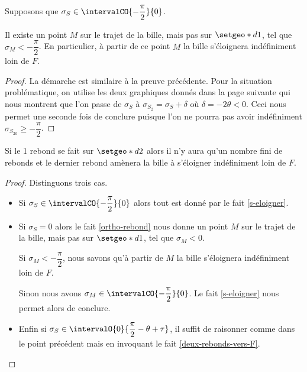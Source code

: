 \medskip


\begin{fact} \label{s-eloigner}
	Supposons que $\sigma_S \in \intervalCO{- \dfrac{\pi}{2}}{0}$.

	\medskip
	
	Il existe un point $M$ sur le trajet de la bille, mais pas sur $\setgeo*{d}{1}$, tel que $\sigma_M < - \dfrac{\pi}{2}$. En particulier, à partir de ce point $M$ la bille s'éloignera indéfiniment loin de $F$.
\end{fact}

\begin{proof}
	La démarche est similaire à la preuve précédente.
	Pour la situation problématique, on utilise les deux graphiques donnés dans la page suivante qui nous montrent que l'on passe de $\sigma_S$ à $\sigma_{S_2} = \sigma_S + \delta$ où $\delta = - 2 \theta < 0$. Ceci nous permet une seconde fois de conclure puisque l'on ne pourra pas avoir indéfiniment $\sigma_{S_{2k}} \geqslant - \dfrac{\pi}{2}$.
\end{proof}


\medskip


\begin{theorem}
	Si le 1\ier{} rebond se fait sur $\setgeo*{d}{2}$ alors il n'y aura qu'un nombre fini de rebonds et le dernier rebond amènera la bille à s'éloigner indéfiniment loin de $F$.
\end{theorem}

\begin{proof}
	Distinguons trois cas.
	
	\begin{itemize}[label = \textbullet]
		\item Si $\sigma_S \in \intervalCO{- \dfrac{\pi}{2}}{0}$ alors tout est donné par le fait \ref{s-eloigner}.


		\item Si $\sigma_S = 0$ alors le fait \ref{ortho-rebond} nous donne un point $M$ sur le trajet de la bille, mais pas sur $\setgeo*{d}{1}$, tel que $\sigma_M < 0$.
		
		\noindent
		Si $\sigma_M < - \dfrac{\pi}{2}$, nous savons qu'à partir de $M$ la bille s'éloignera indéfiniment loin de $F$.
		
		\noindent
		Sinon nous avons $\sigma_M \in \intervalCO{- \dfrac{\pi}{2}}{0}$.
		Le fait \ref{s-eloigner} nous permet alors de conclure.
		
		
		\item Enfin si $\sigma_S \in \intervalO{0}{\dfrac{\pi}{2} - \theta + \tau}$, il suffit de raisonner comme dans le point précédent mais en invoquant le fait \ref{deux-rebonds-vers-F}.
	\end{itemize}
\end{proof}

